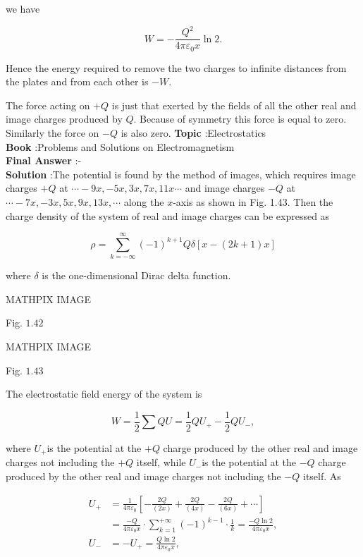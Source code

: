 \documentclass[10pt]{article}
\begin{document}
we have

$$
W=-\frac{Q^{2}}{4 \pi \varepsilon_{0} x} \ln 2 .
$$

Hence the energy required to remove the two charges to infinite distances from the plates and from each other is $-W$.

 The force acting on $+Q$ is just that exerted by the fields of all the other real and image charges produced by $Q$. Because of symmetry this force is equal to zero. Similarly the force on $-Q$ is also zero.
\textbf{Topic} :Electrostatics\\
\textbf{Book} :Problems and Solutions on Electromagnetism\\
\textbf{Final Answer} :- \\


\textbf{Solution} :The potential is found by the method of images, which requires image charges $+Q$ at $\cdots-9 x,-5 x, 3 x, 7 x, 11 x \cdots$ and image charges $-Q$ at $\cdots-7 x,-3 x, 5 x, 9 x, 13 x, \cdots$ along the $x$-axis as shown in Fig. 1.43. Then the charge density of the system of real and image charges can be expressed as

$$
\rho=\sum_{k=-\infty}^{\infty}(-1)^{k+1} Q \delta[x-(2 k+1) x]
$$

where $\delta$ is the one-dimensional Dirac delta function. 

MATHPIX IMAGE

Fig. $1.42$

MATHPIX IMAGE

Fig. $1.43$

The electrostatic field energy of the system is

$$
W=\frac{1}{2} \sum Q U=\frac{1}{2} Q U_{+}-\frac{1}{2} Q U_{-},
$$

where $U_{+}$is the potential at the $+Q$ charge produced by the other real and image charges not including the $+Q$ itself, while $U_{-}$is the potential at the $-Q$ charge produced by the other real and image charges not including the $-Q$ itself. As

$$
\begin{aligned}
U_{+} &=\frac{1}{4 \pi \varepsilon_{0}}\left[-\frac{2 Q}{(2 x)}+\frac{2 Q}{(4 x)}-\frac{2 Q}{(6 x)}+\cdots\right] \\
&=\frac{-Q}{4 \pi \varepsilon_{0} x} \cdot \sum_{k=1}^{+\infty}(-1)^{k-1} \cdot \frac{1}{k}=\frac{-Q \ln 2}{4 \pi \varepsilon_{0} x}, \\
U_{-} &=-U_{+}=\frac{Q \ln 2}{4 \pi \varepsilon_{0} x},
\end{aligned}
$$
\end{document}
